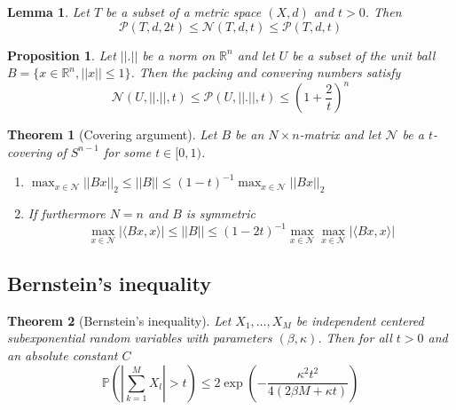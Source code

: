 \documentclass[10pt,a4paper]{article}
\theoremstyle{thmstyle}
\newtheorem{lemma}{Lemma}
\newtheorem{theorem}{Theorem}
\newtheorem{proposition}{Proposition}
\renewcommand{\Pr}[1]{\mathbb{P}\left( #1 \right)}
\begin{document}
\begin{lemma}
  Let $T$ be a subset of a metric space $(X, d)$ and $t > 0$.
  Then
  \begin{equation*}
    \mathcal{P}(T, d, 2t) \le \mathcal{N}(T, d, t) \le \mathcal{P}(T, d, t)
  \end{equation*}
\end{lemma}

\begin{proposition}
  Let $||.||$ be a norm on $\mathbb{R}^{n}$ and let $U$ be a subset of the unit ball $B = \{ x \in \mathbb{R}^{n}, ||x|| \le 1 \}$.
  Then the packing and convering numbers satisfy
  \begin{equation*}
    \mathcal{N}(U, ||.||, t) \le \mathcal{P}(U, ||.||, t) \le \left( 1 + \frac{2}{t} \right)^{n}
  \end{equation*}
\end{proposition}

\begin{theorem}[Covering argument]
  Let $B$ be an $N \times n$-matrix and let $\mathcal{N}$ be a $t$-covering of $S^{n - 1}$ for some $t \in [0, 1)$.
  \begin{enumerate}
  \item $\max_{x \in \mathcal{N}} ||Bx||_{2} \le ||B|| \le (1 - t)^{-1} \max_{x \in \mathcal{N}} ||Bx||_{2}$
  \item If furthermore $N = n$ and $B$ is symmetric
    \begin{equation*}
      \max_{x \in \mathcal{N}} |\langle Bx, x \rangle| \le ||B|| \le (1 - 2t)^{-1} \max_{x \in \mathcal{N}} \max_{x \in \mathcal{N}} |\langle Bx, x \rangle|
    \end{equation*}
  \end{enumerate}
\end{theorem}

\subsection{Bernstein's inequality}

\begin{theorem}[Bernstein's inequality]
  Let $X_{1}, \dots, X_{M}$ be independent centered subexponential random variables with parameters $(\beta, \kappa)$.
  Then for all $t > 0$ and an absolute constant $C$
  \begin{equation*}
    \Pr{\left| \sum_{k = 1}^{M} X_{l} \right| > t} \le 2\exp\left( -\frac{\kappa^{2} t^{2}}{4(2\beta M + \kappa t)} \right)
  \end{equation*}
\end{theorem}
\end{document}
